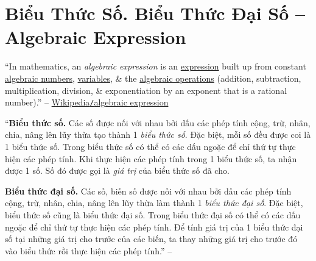 \documentclass{article}
\numberwithin{equation}{section}
\begin{document}

\section{Biểu Thức Số. Biểu Thức Đại Số -- Algebraic Expression}
``In mathematics, an \textit{algebraic expression} is an \href{https://en.wikipedia.org/wiki/Expression_(mathematics)}{expression} built up from constant \href{https://en.wikipedia.org/wiki/Algebraic_number}{algebraic numbers}, \href{https://en.wikipedia.org/wiki/Variable_(mathematics)}{variables}, \& the \href{https://en.wikipedia.org/wiki/Algebraic_operation}{algebraic operations} (addition, subtraction, multiplication, division, \& exponentiation by an exponent that is a rational number).'' -- \href{https://en.wikipedia.org/wiki/Algebraic_expression}{Wikipedia\texttt{/}algebraic expression}

``\textbf{Biểu thức số.} Các số được nối với nhau bởi dấu các phép tính cộng, trừ, nhân, chia, nâng lên lũy thừa tạo thành 1 \textit{biểu thức số}. Đặc biệt, mỗi số đều được coi là 1 biểu thức số. Trong biểu thức số có thể có các dấu ngoặc để chỉ thứ tự thực hiện các phép tính. Khi thực hiện các phép tính trong 1 biểu thức số, ta nhận được 1 số. Số đó được gọi là \textit{giá trị} của biểu thức số đã cho.

\textbf{Biểu thức đại số.} Các số, biến số được nối với nhau bởi dấu các phép tính cộng, trừ, nhân, chia, nâng lên lũy thừa làm thành 1 \textit{biểu thức đại số}. Đặc biệt, biểu thức số cũng là biểu thức đại số. Trong biểu thức đại số có thể có các dấu ngoặc để chỉ thứ tự thực hiện các phép tính. Để tính giá trị của 1 biểu thức đại số tại những giá trị cho trước của các biến, ta thay những giá trị cho trước đó vào biểu thức rồi thực hiện các phép tính.'' -- \cite[Chap. VI, \S1, p. 35]{SBT_Toan_7_Canh_Dieu_tap_2}
\end{document}
